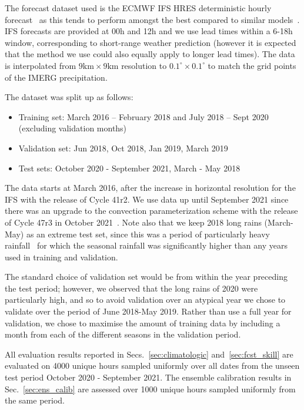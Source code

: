 \documentclass{article}
\begin{document}
The forecast dataset used is the ECMWF IFS HRES deterministic hourly forecast~\citep{ecmwf_operational_2023} as this tends to perform amongst the best compared to similar models~\citep{haiden_intercomparison_2012}. IFS forecasts are provided at 00h and 12h and we use lead times within a 6-18h window, corresponding to short-range weather prediction (however it is expected that the method we use could also equally apply to longer lead times). The data is interpolated from $9\text{km} \times 9\text{km}$ resolution to $0.1^{\circ} \times 0.1^{\circ}$ to match the grid points of the IMERG precipitation.

The dataset was split up as follows:
\begin{itemize}
    \item Training set: March 2016 – February 2018 and July 2018 – Sept 2020 (excluding validation months)
    \item Validation set: Jun 2018, Oct 2018, Jan 2019, March 2019
    \item Test sets: October 2020 - September 2021, March - May 2018
\end{itemize}
The data starts at March 2016, after the increase in horizontal resolution for the IFS with the release of Cycle 41r2. We use data up until September 2021 since there was an upgrade to the convection parameterization scheme with the release of Cycle 47r3 in October 2021~\cite{ecmwf_changes_2023}. Note also that we keep 2018 long rains (March-May) as an extreme test set, since this was a period of particularly heavy rainfall~\citep{kilavi_extreme_2018} for which the seasonal rainfall was significantly higher than any years used in training and validation. 

The standard choice of validation set would be from within the year preceding the test period; however, we observed that the long rains of 2020 were particularly high, and so to avoid validation over an atypical year we chose to validate over the period of June 2018-May 2019. Rather than use a full year for validation, we chose to maximise the amount of training data by including a month from each of the different seasons in the validation period. 

All evaluation results reported in Secs.~\ref{sec:climatologic} and~\ref{sec:fcst_skill} are evaluated on 4000 unique hours sampled uniformly over all dates from the unseen test period October 2020 - September 2021. The ensemble calibration results in Sec.~\ref{sec:ens_calib} are assessed over 1000 unique hours sampled uniformly from the same period. 
\end{document}
